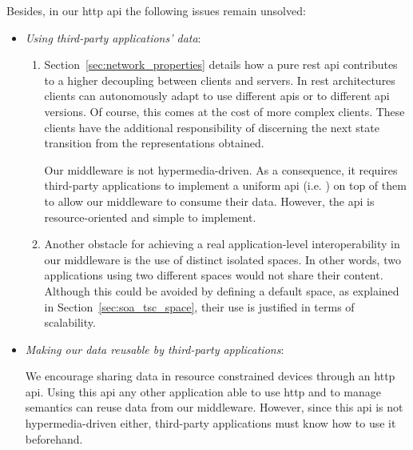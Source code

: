 Besides, in our \ac{http} \ac{api} the following issues remain unsolved:
\begin{itemize} %
  \item \emph{Using third-party applications' data}:
  \begin{enumerate}
    \item Section~\ref{sec:network_properties} details how a pure \ac{rest} \ac{api} contributes to a higher decoupling between clients and servers.
	  In \ac{rest} architectures clients can autonomously adapt to use different \acp{api} or to different \ac{api} versions. %
	  Of course, this comes at the cost of more complex clients.
	  These clients have the additional responsibility of discerning the next state transition from the representations obtained. %
	  
	  Our middleware is not hypermedia-driven.
	  As a consequence, it requires third-party applications to implement a uniform \ac{api} (i.e. \osapi{}) on top of them to allow our middleware to consume their data.
	  However, the \ac{api} is resource-oriented and simple to implement.
	  
    \item Another obstacle for achieving a real application-level interoperability in our middleware is the use of distinct isolated spaces.
	  In other words, two applications using two different spaces would not share their content.
	  Although this could be avoided by defining a default space, as explained in Section~\ref{sec:soa_tsc_space}, their use is justified in terms of scalability.
  \end{enumerate}
  
  \item \emph{Making our data reusable by third-party applications}:
	
	We encourage sharing data in resource constrained devices through an \ac{http} \ac{api}.
	Using this \ac{api} any other application able to use \ac{http} and to manage semantics can reuse data from our middleware.
	However, since this \ac{api} is not hypermedia-driven either, 
	third-party applications must know how to use it beforehand. %
\end{itemize}


